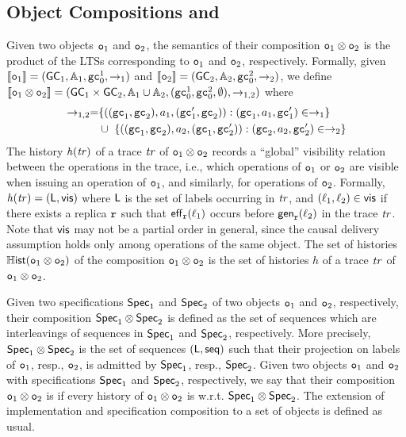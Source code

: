 \subsection{Object Compositions and \CRDTLin{}}\label{ssec:comp_intro}

Given two objects $\mathtt{o}_1$ and $\mathtt{o}_2$, the semantics of their composition $\mathtt{o}_1\otimes \mathtt{o}_2$ is the product of the LTSs corresponding to $\mathtt{o}_1$ and $\mathtt{o}_2$, respectively. Formally, given $\llbracket \mathtt{o}_1 \rrbracket =(\mathsf{GC}_1,\mathbb{A}_1,\mathtt{gc}_0^1,\rightarrow_1)$ and $\llbracket \mathtt{o}_2 \rrbracket =(\mathsf{GC}_2,\mathbb{A}_2,\mathtt{gc}_0^2,\rightarrow_2)$, we define $\llbracket \mathtt{o}_1\otimes \mathtt{o}_2 \rrbracket =(\mathsf{GC}_1\times \mathsf{GC}_2,\mathbb{A}_1\cup \mathbb{A}_2,(\mathtt{gc}_0^1,\mathtt{gc}_0^2,\emptyset),\rightarrow_{1,2})$ where
\begin{align*}
\rightarrow_{1,2} = & \{ ((\mathtt{gc}_1,\mathtt{gc}_2),a_1,(\mathtt{gc}_1',\mathtt{gc}_2)): (\mathtt{gc}_1,a_1,\mathtt{gc}_1')\in\rightarrow_1\} \\
& \cup\ \{ ((\mathtt{gc}_1,\mathtt{gc}_2),a_2,(\mathtt{gc}_1,\mathtt{gc}_2')): (\mathtt{gc}_2,a_2,\mathtt{gc}_2')\in\rightarrow_2\}
\end{align*}
The history $\mathit{h}({\mathit{tr})}$ of a trace $\mathit{tr}$ of $\mathtt{o}_1\otimes \mathtt{o}_2$ records a ``global'' visibility relation between the operations in the trace, i.e., which operations of $\mathtt{o}_1$ or $\mathtt{o}_2$ are visible when issuing an operation of $\mathtt{o}_1$, and similarly, for operations of $\mathtt{o}_2$. Formally, $\mathit{h}({\mathit{tr})}=(\mathsf{L}, \mathsf{vis})$ where $\mathsf{L}$ is the set of labels occurring in $\mathit{tr}$, and $(\ell_1,\ell_2)\in\mathsf{vis}$ if there exists a replica $\mathtt{r}$ such that $\mathsf{eff}_{\mathtt{r}}(\ell_1)$ occurs before $\mathsf{gen}_{\mathtt{r}}(\ell_2)$ in the trace $\mathit{tr}$. Note that $\mathsf{vis}$ may not be a partial order in general, since the causal delivery assumption holds only among operations of the same object. The set of histories $\mathbb{H}\mathsf{ist}(\mathtt{o}_1\otimes \mathtt{o}_2)$ of the composition $\mathtt{o}_1\otimes \mathtt{o}_2$ is the set of histories $h$ of a trace $\mathit{tr}$ of $\mathtt{o}_1\otimes \mathtt{o}_2$.

Given two specifications $\mathsf{Spec}_1$ and $\mathsf{Spec}_2$ of two objects $\mathtt{o}_1$ and $\mathtt{o}_2$, respectively, their composition $\mathsf{Spec}_1\otimes \mathsf{Spec}_2$ is defined as the set of sequences which are interleavings of sequences in $\mathsf{Spec}_1$ and $\mathsf{Spec}_2$, respectively. More precisely, $\mathsf{Spec}_1\otimes \mathsf{Spec}_2$ is the set of sequences $(\mathsf{L},\mathsf{seq})$ such that their projection on labels of $\mathtt{o}_1$, resp., $\mathtt{o}_2$, is admitted by $\mathsf{Spec}_1$, resp., $\mathsf{Spec}_2$. Given two objects  $\mathtt{o}_1$ and $\mathtt{o}_2$ with specifications $\mathsf{Spec}_1$ and $\mathsf{Spec}_2$, respectively, we say that their composition $\mathtt{o}_1\otimes \mathtt{o}_2$ is \emph{\crdtlinearizable{}} if every history of $\mathtt{o}_1\otimes \mathtt{o}_2$ is \crdtlinearizable{} w.r.t. $\mathsf{Spec}_1\otimes \mathsf{Spec}_2$. The extension of implementation and specification composition to a set of objects is defined as usual.

